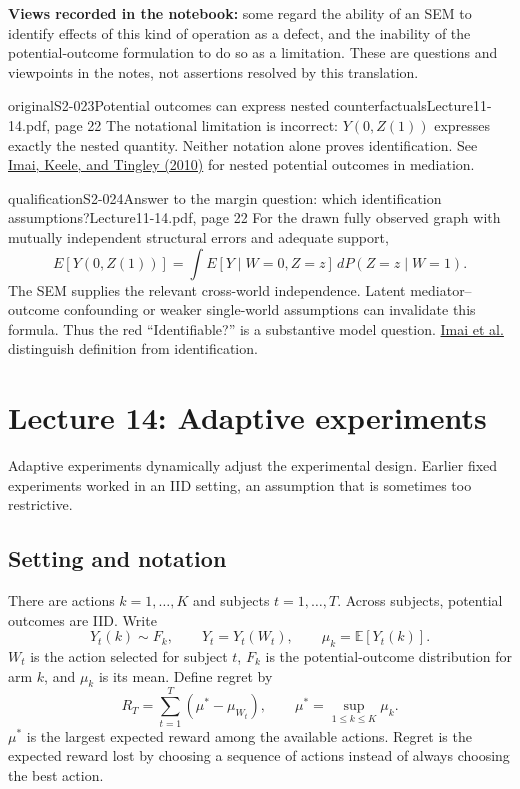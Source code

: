 \textbf{Views recorded in the notebook:} some regard the ability of an SEM to identify effects of this kind of operation as a defect, and the inability of the potential-outcome formulation to do so as a limitation.  These are questions and viewpoints in the notes, not assertions resolved by this translation.

\begin{reviewnote}{original}{S2-023}{Potential outcomes can express nested counterfactuals}{Lecture11-14.pdf, page 22}
The notational limitation is incorrect: $Y(0,Z(1))$ expresses exactly the nested quantity. Neither notation alone proves identification. See \href{https://imai.sites.fas.harvard.edu/research/files/BaronKenny.pdf}{Imai, Keele, and Tingley (2010)} for nested potential outcomes in mediation.
\end{reviewnote}

\begin{reviewnote}{qualification}{S2-024}{Answer to the margin question: which identification assumptions?}{Lecture11-14.pdf, page 22}
For the drawn fully observed graph with mutually independent structural errors and adequate support,
\[
 E[Y(0,Z(1))]=\int E[Y\mid W=0,Z=z]\,dP(Z=z\mid W=1).
\]
The SEM supplies the relevant cross-world independence. Latent mediator--outcome confounding or weaker single-world assumptions can invalidate this formula. Thus the red ``Identifiable?'' is a substantive model question. \href{https://imai.sites.fas.harvard.edu/research/files/BaronKenny.pdf}{Imai et al.} distinguish definition from identification.
\end{reviewnote}


\section{Lecture 14: Adaptive experiments}
Adaptive experiments dynamically adjust the experimental design. Earlier fixed experiments worked in an IID setting, an assumption that is sometimes too restrictive.

\subsection{Setting and notation}
There are actions $k=1,\ldots,K$ and subjects $t=1,\ldots,T$. Across subjects, potential outcomes are IID. Write
\[
 Y_t(k)\sim F_k,\qquad Y_t=Y_t(W_t),\qquad
 \mu_k=\mathbb E[Y_t(k)].
\]
$W_t$ is the action selected for subject $t$, $F_k$ is the potential-outcome distribution for arm $k$, and $\mu_k$ is its mean. Define regret by
\[
 R_T=\sum_{t=1}^T(\mu^*-\mu_{W_t}),\qquad
 \mu^*=\sup_{1\le k\le K}\mu_k.
\]
$\mu^*$ is the largest expected reward among the available actions. Regret is the expected reward lost by choosing a sequence of actions instead of always choosing the best action.

